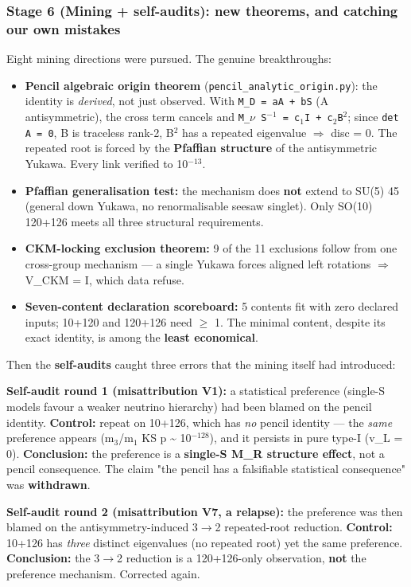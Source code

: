 \documentclass[11pt]{article}
\begin{document}
\subsubsection*{Stage 6 (Mining + self-audits): new theorems, and catching our own mistakes}

Eight mining directions were pursued. The genuine breakthroughs:
\begin{itemize}
\item \textbf{Pencil algebraic origin theorem} (\texttt{pencil\_analytic\_origin.py}): the identity is
  \emph{derived}, not just observed. With \texttt{M\_D = aA + bS} (A antisymmetric), the cross
  term cancels and \texttt{M\_$\nu$ S$^{-1}$ = c$_1$I + c$_2$B$^2$}; since \texttt{det A = 0}, B is traceless rank-2,
  B$^2$ has a repeated eigenvalue $\Rightarrow$ disc = 0. The repeated root is forced by the
  \textbf{Pfaffian structure} of the antisymmetric Yukawa. Every link verified to 10$^{-13}$.
\item \textbf{Pfaffian generalisation test:} the mechanism does \textbf{not} extend to SU(5) 45
  (general down Yukawa, no renormalisable seesaw singlet). Only SO(10) 120+126 meets
  all three structural requirements.
\item \textbf{CKM-locking exclusion theorem:} 9 of the 11 exclusions follow from one
  cross-group mechanism --- a single Yukawa forces aligned left rotations $\Rightarrow$
  V\_CKM = I, which data refuse.
\item \textbf{Seven-content declaration scoreboard:} 5 contents fit with zero declared
  inputs; 10+120 and 120+126 need $\geq$ 1. The minimal content, despite its exact
  identity, is among the \textbf{least economical}.
\end{itemize}

Then the \textbf{self-audits} caught three errors that the mining itself had introduced:

\textbf{Self-audit round 1 (misattribution V1):} a statistical preference (single-S
models favour a weaker neutrino hierarchy) had been blamed on the pencil identity.
\textbf{Control:} repeat on 10+126, which has \emph{no} pencil identity --- the \emph{same}
preference appears (m$_3$/m$_1$ KS p \textasciitilde{} 10$^{-128}$), and it persists in pure type-I (v\_L = 0).
\textbf{Conclusion:} the preference is a \textbf{single-S M\_R structure effect}, not a pencil
consequence. The claim "the pencil has a falsifiable statistical consequence" was
\textbf{withdrawn}.

\textbf{Self-audit round 2 (misattribution V7, a relapse):} the preference was then
blamed on the antisymmetry-induced 3$\rightarrow$2 repeated-root reduction. \textbf{Control:} 10+126
has \emph{three} distinct eigenvalues (no repeated root) yet the same preference.
\textbf{Conclusion:} the 3$\rightarrow$2 reduction is a 120+126-only observation, \textbf{not} the
preference mechanism. Corrected again.
\end{document}
